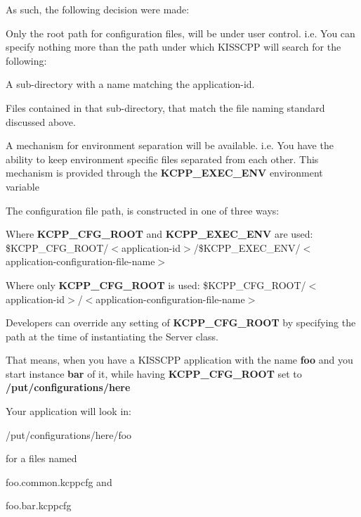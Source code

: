 As such, the following decision were made\-:


\begin{DoxyEnumerate}
\item Only the root path for configuration files, will be under user control. i.\-e. You can specify nothing more than the path under which K\-I\-S\-S\-C\-P\-P will search for the following\-:
\begin{DoxyItemize}
\item A sub-\/directory with a name matching the application-\/id.
\item Files contained in that sub-\/directory, that match the file naming standard discussed above.
\end{DoxyItemize}
\item A mechanism for environment separation will be available. i.\-e. You have the ability to keep environment specific files separated from each other. This mechanism is provided through the {\bfseries K\-C\-P\-P\-\_\-\-E\-X\-E\-C\-\_\-\-E\-N\-V} environment variable
\end{DoxyEnumerate}

The configuration file path, is constructed in one of three ways\-:


\begin{DoxyItemize}
\item Where {\bfseries K\-C\-P\-P\-\_\-\-C\-F\-G\-\_\-\-R\-O\-O\-T} and {\bfseries K\-C\-P\-P\-\_\-\-E\-X\-E\-C\-\_\-\-E\-N\-V} are used\-: \$\-K\-C\-P\-P\-\_\-\-C\-F\-G\-\_\-\-R\-O\-O\-T/$<$application-\/id$>$/\$\-K\-C\-P\-P\-\_\-\-E\-X\-E\-C\-\_\-\-E\-N\-V/$<$application-\/configuration-\/file-\/name$>$
\item Where only {\bfseries K\-C\-P\-P\-\_\-\-C\-F\-G\-\_\-\-R\-O\-O\-T} is used\-: \$\-K\-C\-P\-P\-\_\-\-C\-F\-G\-\_\-\-R\-O\-O\-T/$<$application-\/id$>$/$<$application-\/configuration-\/file-\/name$>$
\item Developers can override any setting of {\bfseries K\-C\-P\-P\-\_\-\-C\-F\-G\-\_\-\-R\-O\-O\-T} by specifying the path at the time of instantiating the Server class.
\end{DoxyItemize}

That means, when you have a K\-I\-S\-S\-C\-P\-P application with the name {\bfseries foo} and you start instance {\bfseries bar} of it, while having {\bfseries K\-C\-P\-P\-\_\-\-C\-F\-G\-\_\-\-R\-O\-O\-T} set to {\bfseries /put/configurations/here}

Your application will look in\-:
\begin{DoxyItemize}
\item /put/configurations/here/foo
\item for a files named
\begin{DoxyItemize}
\item foo.\-common.\-kcppcfg and
\item foo.\-bar.\-kcppcfg
\end{DoxyItemize}
\end{DoxyItemize}

